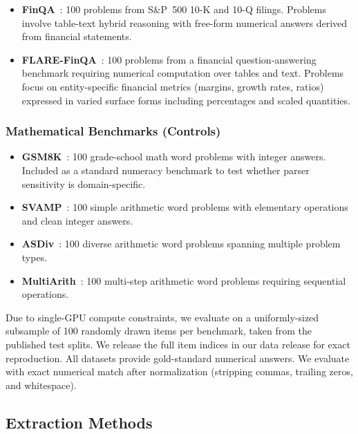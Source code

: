 \begin{itemize}
    \item \textbf{FinQA}~\cite{chen2021finqa}: 100 problems from S\&P~500 10-K and 10-Q filings. Problems involve table-text hybrid reasoning with free-form numerical answers derived from financial statements.
    \item \textbf{FLARE-FinQA}~\cite{xie2024finben}: 100 problems from a financial question-answering benchmark requiring numerical computation over tables and text. Problems focus on entity-specific financial metrics (margins, growth rates, ratios) expressed in varied surface forms including percentages and scaled quantities.
\end{itemize}

\subsubsection{Mathematical Benchmarks (Controls)}

\begin{itemize}
    \item \textbf{GSM8K}~\cite{cobbe2021gsm8k}: 100 grade-school math word problems with integer answers. Included as a standard numeracy benchmark to test whether parser sensitivity is domain-specific.
    \item \textbf{SVAMP}~\cite{patel2021svamp}: 100 simple arithmetic word problems with elementary operations and clean integer answers.
    \item \textbf{ASDiv}~\cite{miao2020asdiv}: 100 diverse arithmetic word problems spanning multiple problem types.
    \item \textbf{MultiArith}~\cite{roy2015multiarith}: 100 multi-step arithmetic word problems requiring sequential operations.
\end{itemize}

Due to single-GPU compute constraints, we evaluate on a uniformly-sized subsample of 100 randomly drawn items per benchmark, taken from the published test splits. We release the full item indices in our data release for exact reproduction. All datasets provide gold-standard numerical answers. We evaluate with exact numerical match after normalization (stripping commas, trailing zeros, and whitespace).

\subsection{Extraction Methods}
\label{sec:extraction}

